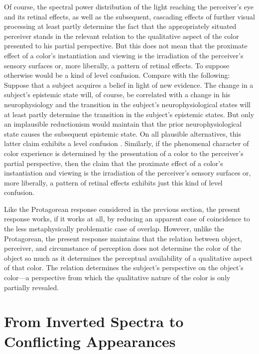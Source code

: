 \documentclass[12pt]{article}
\begin{document}
Of course, the spectral power distribution of the light reaching the perceiver's eye and its retinal effects, as well as the subsequent, cascading effects of further visual processing at least partly determine the fact that the appropriately situated perceiver stands in the relevant relation to the qualitative aspect of the color presented to his partial perspective. But this does not mean that the proximate effect of a color's instantiation and viewing is the irradiation of the perceiver's sensory surfaces or, more liberally, a pattern of retinal effects. To suppose otherwise would be a kind of level confusion. Compare with the following: Suppose that a subject acquires a belief in light of new evidence. The change in a subject's epistemic state will, of course, be correlated with a change in his neurophysiology and the transition in the subject's neurophysiological states will at least partly determine the transition in the subject's epistemic states. But only an implausible reductionism would maintain that the prior neurophysiological state causes the subsequent epistemic state. On all plausible alternatives, this latter claim exhibits a level confusion \citep[see][]{McDowell:1998lr}. Similarly, if the phenomenal character of color experience is determined by the presentation of a color to the perceiver's partial perspective, then the claim that the proximate effect of a color's instantiation and viewing is the irradiation of the perceiver's sensory surfaces or, more liberally, a pattern of retinal effects exhibits just this kind of level confusion.

Like the Protagorean response considered in the previous section, the present response works, if it works at all, by reducing an apparent case of coincidence to the less metaphysically problematic case of overlap. However, unlike the Protagorean, the present response maintains that the relation between object, perceiver, and circumstance of perception does not determine the color of the object so much as it determines the perceptual availability of a qualitative aspect of that color. The relation determines the subject's perspective on the object's color---a perspective from which the qualitative nature of the color is only partially revealed.

\section{From Inverted Spectra to Conflicting Appearances}\label{sec:conclusion}
\end{document}
